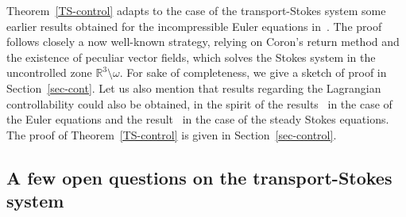 \documentclass[10pt]{amsart}
\theoremstyle{definition}\newtheorem{defi}[theo]{Definition}\newtheorem{rema}[theo]{Remark}\newtheorem{exam}[theo]{Example}\newtheorem{exem}[theo]{Example}\newtheorem{nota}[theo]{Notation}
\newcommand{\R}{\mathbb{R}}
\begin{document}
Theorem~\ref{TS-control} adapts to the case of the transport-Stokes system some earlier results obtained for the incompressible Euler equations in~\cite{Coron96,G20,G}. The proof follows closely a now well-known strategy, relying on Coron's return method and the existence of peculiar vector fields, which solves the Stokes system in the uncontrolled zone $\R^3 \setminus \omega$. For sake of completeness, we give a sketch of proof in Section~\ref{sec-cont}. Let us also mention that results regarding the Lagrangian controllability could also be obtained, in the spirit of the results~\cite{GH1,GH2,HK} in the case of the Euler equations and the result~\cite{GH3} in the case of the steady Stokes equations. The proof of Theorem~\ref{TS-control} is given in Section~\ref{sec-control}.


\subsection{A few open questions on the transport-Stokes system}
\end{document}
